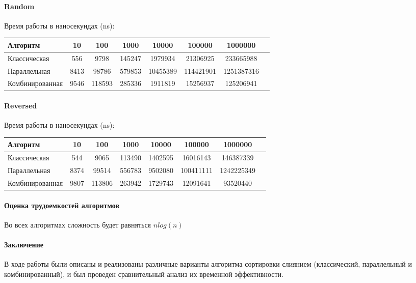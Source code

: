 \documentclass[utf8x, 12pt]{G7-32} %
\begin{document}
\begin{flushleft}
	\paragraph{Random}
\end{flushleft}

Время работы в наносекундах (ns):\\
\begin{tabular}{l*{6}{c}r}
	Алгоритм & 10 & 100 & 1000 & 10000 & 100000 & 1000000 \\
	\hline
	Классическая & 556 & 9798 & 145247 & 1979934 & 21306925 & 233665988 \\
	Параллельная & 8413 & 98786 & 579853 & 10455389 & 114421901 & 1251387316 \\
	Комбинированная & 9546 & 118593 & 285336 & 1911819 & 15256937 & 125206941 \\
\end{tabular}

\begin{flushleft}
	\paragraph{Reversed}
\end{flushleft}

Время работы в наносекундах (ns):\\
\begin{tabular}{l*{6}{c}r}
	Алгоритм & 10 & 100 & 1000 & 10000 & 100000 & 1000000 \\
	\hline
	Классическая & 544 & 9065 & 113490 & 1402595 & 16016143 & 146387339 \\
	Параллельная & 8374 & 99514 & 556783 & 9502080 & 100411111 & 1242225349 \\
	Комбинированная & 9807 & 113806 & 263942 & 1729743 & 12091641 & 93520440 \\
\end{tabular}

\newpage

\paragraph{Оценка трудоемкостей алгоритмов}

Во всех алгоритмах сложность будет равняться $nlog(n)$

\paragraph{Заключение}

В ходе работы были описаны и реализованы различные варианты алгоритма сортировки слиянием (классический, параллельный и комбинированный), и был проведен сравнительный анализ их временной эффективности.

\backmatter %

\appendix   %
\end{document}

